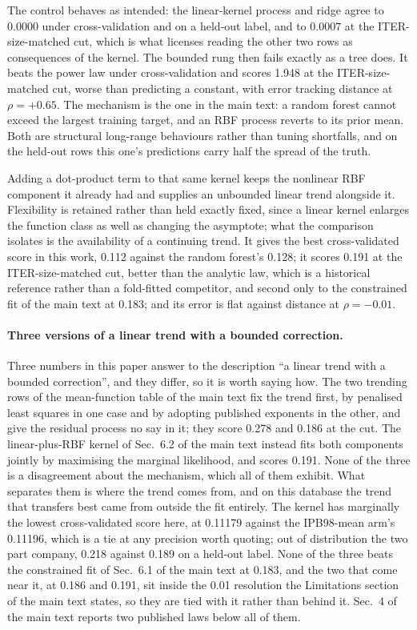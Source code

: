 \documentclass[12pt,letterpaper]{article}
\begin{document}
The control behaves as intended: the linear-kernel process and ridge agree to $0.0000$ under
cross-validation and on a held-out label, and to $0.0007$ at the ITER-size-matched
cut, which is what licenses reading the other two rows as consequences of the
kernel. The bounded rung then fails exactly as a tree does. It beats the power
law under cross-validation and scores 1.948 at the ITER-size-matched cut, worse than
predicting a constant, with error tracking distance at $\rho = +0.65$. The
mechanism is the one in the main text: a random forest cannot exceed
the largest training target, and an RBF process reverts to its prior mean. Both are
structural long-range behaviours rather than tuning shortfalls, and on the
held-out rows this one's
predictions carry half the spread of the truth.

Adding a dot-product term to that same kernel keeps the nonlinear RBF component
it already had and supplies an unbounded linear trend alongside it. Flexibility
is retained rather than held exactly fixed, since a linear kernel enlarges the
function class as well as changing the asymptote; what the comparison isolates
is the availability of a continuing trend. It gives the best
cross-validated score in this work, 0.112 against the random forest's 0.128; it
scores 0.191 at the ITER-size-matched cut, better than the analytic law, which
is a historical reference rather than a fold-fitted competitor, and second only
to the constrained fit of
the main text at 0.183; and its error is flat against distance at
$\rho = -0.01$.


\paragraph{Three versions of a linear trend with a bounded correction.}
Three numbers in this paper answer to the description ``a linear trend with a
bounded correction'', and they differ, so it is worth saying how. The two
trending rows of the mean-function table of the main text fix the trend first, by penalised least squares in one case
and by adopting published exponents in the other, and give the residual process
no say in it; they score 0.278 and 0.186 at the cut. The linear-plus-RBF kernel
of Sec.~6.2 of the main text instead fits both components jointly by maximising the
marginal likelihood, and scores 0.191. None of the three is a disagreement about
the mechanism, which all of them exhibit. What separates them is where the trend
comes from, and on this database the trend that transfers best came from outside
the fit entirely. The kernel has marginally the lowest cross-validated score here,
at 0.11179 against the IPB98-mean arm's 0.11196, which is a tie at any precision
worth quoting; out of distribution the two part company, 0.218 against 0.189 on
a held-out label. None of the three beats the constrained fit of
Sec.~6.1 of the main text at 0.183, and the two that come near it, at 0.186 and
0.191, sit inside the 0.01 resolution the Limitations section of the main text states, so they
are tied with it rather than behind it. Sec.~4 of the main text reports two
published laws below all of them.
\end{document}
